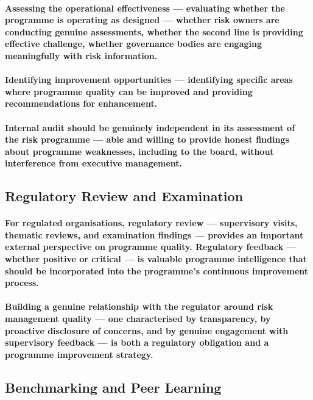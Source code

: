 \paragraph{\textbf{Assessing the operational effectiveness} — evaluating whether the programme is operating as designed — whether risk owners are conducting genuine assessments, whether the second line is providing effective challenge, whether governance bodies are engaging meaningfully with risk information.}
\paragraph{\textbf{Identifying improvement opportunities} — identifying specific areas where programme quality can be improved and providing recommendations for enhancement.}
\paragraph{Internal audit should be genuinely independent in its assessment of the risk programme — able and willing to provide honest findings about programme weaknesses, including to the board, without interference from executive management.}

\subsection{Regulatory Review and Examination}
\paragraph{For regulated organisations, regulatory review — supervisory visits, thematic reviews, and examination findings — provides an important external perspective on programme quality. Regulatory feedback — whether positive or critical — is valuable programme intelligence that should be incorporated into the programme's continuous improvement process.}
\paragraph{Building a genuine relationship with the regulator around risk management quality — one characterised by transparency, by proactive disclosure of concerns, and by genuine engagement with supervisory feedback — is both a regulatory obligation and a programme improvement strategy.}

\subsection{Benchmarking and Peer Learning}
